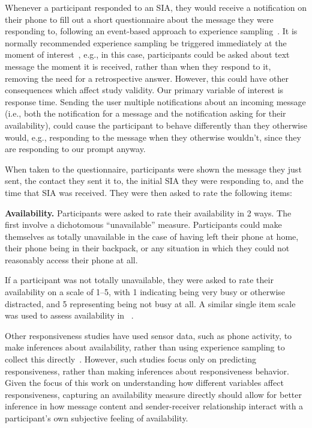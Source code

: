 \documentclass[12pt]{nuthesis}	%
\begin{document}
Whenever a participant responded to an SIA, they would receive a notification on their phone to fill out a short questionnaire about the message they were responding to, following an event-based approach to experience sampling~\citep{conner2009experience,csikszentmihalyi2014validity}. It is normally recommended experience sampling  be triggered immediately at the moment of interest~\citep{hormuth1986sampling}, e.g., in this case, participants could be asked about text message the moment it is received, rather than when they respond to it, removing the need for a retrospective answer. However, this could have other consequences which affect study validity. Our primary variable of interest is response time. Sending the user multiple notifications about an incoming message (i.e., both the notification for a message and the notification asking for their availability), could cause the participant to behave differently than they otherwise would, e.g., responding to the message when they otherwise wouldn't, since they are responding to our prompt anyway.

When taken to the questionnaire, participants were shown the message they just sent, the contact they sent it to, the initial SIA they were responding to, and the time that SIA was received. They were then asked to rate the following items:

\textbf{Availability.} Participants were asked to rate their availability in 2 ways. The first involve a dichotomous ``unavailable'' measure. Participants could make themselves as totally unavailable in the case of having left their phone at home, their phone being in their backpack, or any situation in which they could not reasonably access their phone at all.

If a participant was not totally unavailable, they were asked to rate their availability on a scale of 1--5, with 1 indicating being very busy or otherwise distracted, and 5 representing being not busy at all.  A similar single item scale was used to assess availability in ~\citet{fogarty2005predicting}.

Other responsiveness studies have used sensor data, such as phone activity, to make inferences about availability, rather than using experience sampling to collect this directly~\citep[e.g.,][]{pielot2014didn}. However, such studies focus only on predicting responsiveness, rather than making inferences about responsiveness behavior. Given the focus of this work on understanding how different variables affect responsiveness, capturing an availability measure directly should allow for better inference in how message content and sender-receiver relationship interact with a participant's own subjective feeling of availability.
\end{document}
